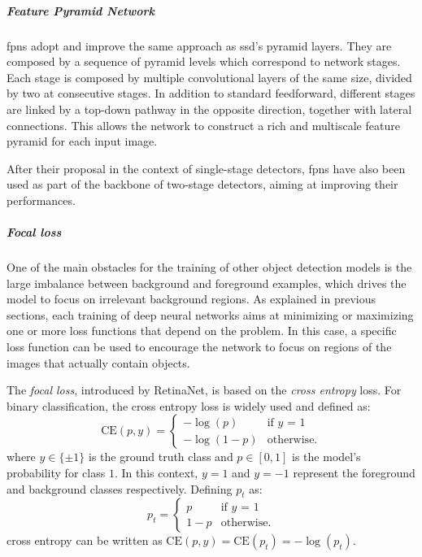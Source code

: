 \documentclass[%
    corpo=12pt,
    twoside,
    stile=classica,   
    tipotesi=magistrale,
    evenboxes,
    english,
	numerazioneromana,
]{toptesi}
\begin{document}
\subparagraph{Feature Pyramid Network}
\glspl{fpn}\cite{lin2017feature} adopt and improve the same approach as \acrshort{ssd}'s pyramid layers. They are composed by a sequence of pyramid levels which correspond to network stages. Each stage is composed by multiple convolutional layers of the same size, divided by two at consecutive stages. In addition to standard feedforward, different stages are linked by a top-down pathway in the opposite direction, together with lateral connections. This allows the network to construct a rich and multiscale feature pyramid for each input image.

After their proposal in the context of single-stage detectors, \glspl{fpn} have also been used as part of the backbone of two-stage detectors, aiming at improving their performances.

\subparagraph{Focal loss}
One of the main obstacles for the training of other object detection models is the large imbalance between background and foreground examples, which drives the model to focus on irrelevant background regions.
As explained in previous sections, each training of deep neural networks aims at minimizing or maximizing one or more loss functions that depend on the problem.
In this case, a specific loss function can be used to encourage the network to focus on regions of the images that actually contain objects.

\bigskip
The \textit{focal loss}, introduced by RetinaNet, is based on the \textit{cross entropy} loss. For binary classification, the cross entropy loss is widely used and defined as:
\begin{equation}
	\text{CE}(p,y) = \begin{cases}
		-\log(p) & \text{if $y$ = 1}\\
		-\log(1-p) & \text{otherwise.}
	\end{cases}
\end{equation}
where $y\in \{\pm 1\}$ is the ground truth class and $p\in\left[0,1\right]$ is the model's probability for class $1$. In this context, $y=1$ and $y=-1$ represent the foreground and background classes respectively. Defining $p_t$ as:
\begin{equation}
	p_t = \begin{cases}
		p & \text{if $y$ = 1}\\
		1-p & \text{otherwise.}
	\end{cases}
\end{equation}
cross entropy can be written as $\text{CE}(p,y) = \text{CE}(p_t) = -\log(p_t)$.
\end{document}
